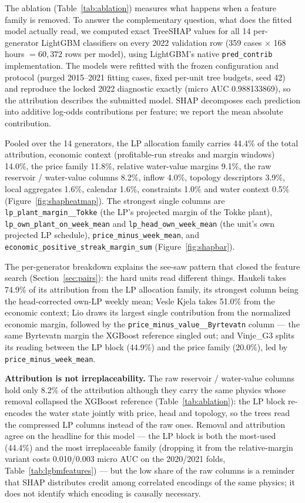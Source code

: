 \documentclass{article}
\begin{document}
The ablation (Table~\ref{tab:ablation}) measures what happens when a
feature family is removed. To answer the complementary question, what
does the fitted model actually read, we computed exact TreeSHAP values
for all 14 per-generator LightGBM classifiers on every 2022 validation
row (359 cases $\times$ 168 hours $= 60{,}372$ rows per model), using
LightGBM's native \texttt{pred\_contrib} implementation. The models were
refitted with the frozen configuration and protocol (purged 2015--2021
fitting cases, fixed per-unit tree budgets, seed 42) and reproduce the
locked 2022 diagnostic exactly (micro AUC 0.988133869), so the
attribution describes the submitted model. SHAP decomposes each
prediction into additive log-odds contributions per feature; we report
the mean absolute contribution.

Pooled over the 14 generators, the LP allocation family carries 44.4\%
of the total attribution, economic context (profitable-run streaks and
margin windows) 14.0\%, the price family 11.8\%, relative water-value
margins 9.1\%, the raw reservoir / water-value columns 8.2\%, inflow
4.0\%, topology descriptors 3.9\%, local aggregates 1.6\%, calendar
1.6\%, constraints 1.0\% and water context 0.5\%
(Figure~\ref{fig:shapheatmap}). The strongest single columns are
\texttt{lp\_plant\_margin\_\_Tokke} (the LP's projected margin of the
Tokke plant), \texttt{lp\_own\_plant\_on\_week\_mean} and
\texttt{lp\_head\_own\_week\_mean} (the unit's own projected LP
schedule), \texttt{price\_minus\_week\_mean}, and
\texttt{economic\_positive\_streak\_margin\_sum}
(Figure~\ref{fig:shapbar}).

The per-generator breakdown explains the see-saw pattern that closed
the feature search (Section~\ref{sec:pairs}): the hard units read
different things. Haukeli takes 74.9\% of its attribution from the LP
allocation family, its strongest column being the head-corrected own-LP
weekly mean; Vesle Kjela takes 51.0\% from the economic context; Lio
draws its largest single contribution from the normalized economic
margin, followed by the \texttt{price\_minus\_value\_\_Byrtevatn} column
--- the same Byrtevatn margin the XGBoost reference singled out; and
Vinje\_G3 splits its reading between the LP block (44.9\%) and the price
family (20.0\%), led by \texttt{price\_minus\_week\_mean}.

\textbf{Attribution is not irreplaceability.} The raw reservoir /
water-value columns hold only 8.2\% of the attribution although they
carry the same physics whose removal collapsed the XGBoost reference
(Table~\ref{tab:ablation}): the LP block re-encodes the water state
jointly with price, head and topology, so the trees read the compressed
LP columns instead of the raw ones. Removal and attribution agree on the
headline for this model --- the LP block is both the most-used (44.4\%)
and the most irreplaceable family (dropping it from the relative-margin
variant costs 0.010/0.003 micro AUC on the 2020/2021 folds,
Table~\ref{tab:lgbmfeatures}) --- but the low share of the raw columns is
a reminder that SHAP distributes credit among correlated encodings of
the same physics; it does not identify which encoding is causally
necessary.
\end{document}

